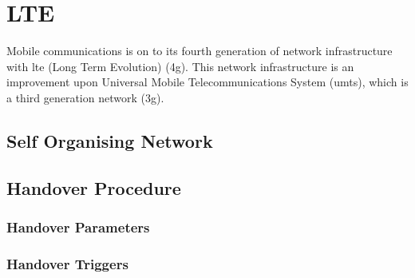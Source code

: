 \chapter{LTE}\label{lte}
Mobile communications is on to its fourth generation of network infrastructure with \ac{lte} (Long Term Evolution) (\ac{4g}). This network infrastructure is an improvement upon Universal Mobile Telecommunications System (\ac{umts}), which is a third generation network (\ac{3g}).
\section{Self Organising Network}\label{self organising network}
\section{Handover Procedure}\label{handover procedure}
\subsection{Handover Parameters}\label{handover parameters}
\subsection{Handover Triggers}\label{handover triggers}
~\cite{cox2012introduction}